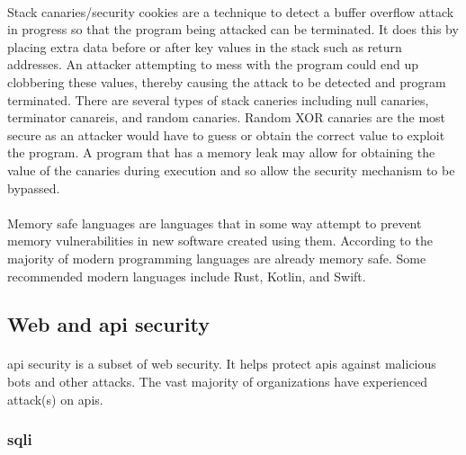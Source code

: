 \paragraph{}Stack canaries/security cookies are a technique to detect a buffer overflow attack in progress so that the program being attacked can be terminated. It does this by placing extra data before or after key values in the stack such as return addresses. An attacker attempting to mess with the program could end up clobbering these values, thereby causing the attack to be detected and program terminated. There are several types of stack caneries including null canaries, terminator canareis, and random canaries. Random XOR canaries are the most secure as an attacker would have to guess or obtain the correct value to exploit the program. A program that has a memory leak may allow for obtaining the value of the canaries during execution and so allow the security mechanism to be bypassed. \autocite{michiel_lemmens_stack_2021}

\paragraph{}Memory safe languages are languages that in some way attempt to prevent memory vulnerabilities in new software created using them. According to \cite{rina_diane_caballar_move_2023} the majority of modern programming languages are already memory safe. Some recommended modern languages include Rust, Kotlin, and Swift.

\paragraph{}

\subsection{Web and \acrshort{api} security}
\paragraph{}\acrfull{api} security is a subset of web security. It helps protect \acrshort{api}s against malicious bots and other attacks. The vast majority of organizations have experienced attack(s) on \acrshort{api}s. \autocite{china_what_2025}

\subsubsection{\acrfull{sqli}}

